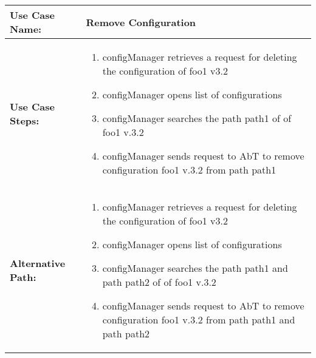 
\begin{tabularx}{\linewidth}{|l|X|}
\hline
\textbf{Use Case Name:} & \textbf{Remove Configuration} \\
\hline
\textbf{Use Case Steps:} & 
\begin{minipage}{\linewidth} 
  \vspace{0.05em}
  \begin{enumerate}
	\item configManager retrieves a request for deleting the configuration of foo1 v3.2
	\item configManager opens list of configurations
	\item configManager searches the path path1 of of foo1 v.3.2
	\item configManager sends request to AbT to remove configuration foo1 v.3.2 from path path1 
  \end{enumerate}
  \vspace{0.05em}
\end{minipage}
\\
\hline 
\textbf{Alternative Path:} &
\begin{minipage}{\linewidth}
  \vspace{0.05em}
    \begin{enumerate}
	\item configManager retrieves a request for deleting the configuration of foo1 v3.2
	\item configManager opens list of configurations
	\item configManager searches the path path1 and path path2 of of foo1 v.3.2
	\item configManager sends request to AbT to remove configuration foo1 v.3.2 from path path1 and path path2
  \end{enumerate}
  \vspace{0.05em} 
\end{minipage}
\\
\hline
\end{tabularx}


